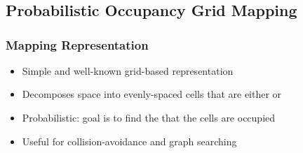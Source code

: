 \documentclass[11pt,professionalfonts,hyperref={pdftex,pdfpagemode=none,pdfstartview=FitH}]{beamer}
\renewcommand{\emph}[1]{\textit{\textbf{\color{blue}{#1}}}}
\begin{document}
\section*{}
\subsection*{Probabilistic Occupancy Grid Mapping}

\begin{frame}
\frametitle{Mapping Representation}
    \begin{itemize}
    	\item Simple and well-known grid-based representation
	\pause
	\item Decomposes space into evenly-spaced cells that are either \emph{occupied} or \emph{free}
	\pause
    	\item Probabilistic: goal is to find the \emph{probability} that the cells are occupied
	\pause
	\item Useful for collision-avoidance and graph searching
    \end{itemize}
    

\end{frame}
\end{document}
